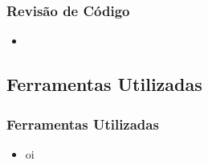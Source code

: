 \frame
{
\frametitle{Revisão de Código}
\begin{itemize}
	\item
\end{itemize}
}

\subsection{Ferramentas Utilizadas}
\frame
{
\frametitle{Ferramentas Utilizadas}
\begin{itemize}
	\item oi
\end{itemize}
}
